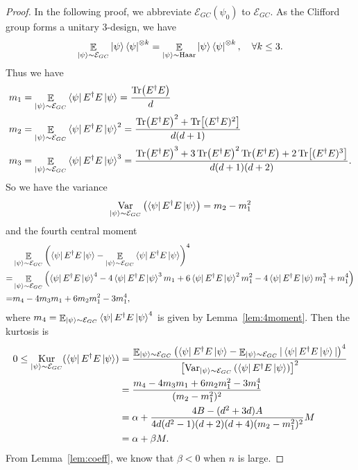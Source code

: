 \documentclass[showpacs,amsmath,amssymb,twocolumn,aps,pra,superscriptaddress,notitlepage,10pt]{revtex4-2}
\newcommand{\bE}{\mathbb E}
\newcommand{\cM}{\mathcal E_{GC}}
\begin{document}
\begin{proof}
    In the following proof, we abbreviate $\cM(\psi_0)$ to $\cM$. As the Clifford group forms a unitary 3-design, we have
    \begin{equation}
        \mathop{\bE}_{\ket{\psi}\sim\cM}\ket{\psi}\bra{\psi}^{\otimes k}=\mathop{\bE}_{\ket{\psi}\sim\mathrm{Haar}}\ket{\psi}\bra{\psi}^{\otimes k},\quad\forall k\le3.
    \end{equation}
    Thus we have
    \begin{align}
        m_1&=\mathop{\bE}_{\ket{\psi}\sim\cM}\bra{\psi}E^\dagger E\ket{\psi}=\frac{\Tr(E^\dagger E)}{d}\\
        m_2&=\mathop{\bE}_{\ket{\psi}\sim\cM}\bra{\psi}E^\dagger E\ket{\psi}^2=\frac{\Tr(E^\dagger E)^2+\Tr[(E^\dagger E)^2]}{d(d+1)}\\
        m_3&=\mathop{\bE}_{\ket{\psi}\sim\cM}\bra{\psi}E^\dagger E\ket{\psi}^3=\frac{\Tr(E^\dagger E)^3+3\Tr(E^\dagger E)^2\Tr(E^\dagger E)+2\Tr[(E^\dagger E)^3]}{d(d+1)(d+2)}.
    \end{align}
    So we have the variance
    \begin{equation}
            \mathop{\mathrm{Var}}_{\ket{\psi}\sim\cM}\left(\bra{\psi}E^\dagger E\ket{\psi}\right)=m_2-m_1^2
    \end{equation}
    and the fourth central moment
    \begin{equation}
        \begin{aligned}
            &\mathop{\bE}_{\ket{\psi}\sim\cM}\left(\bra{\psi}E^\dagger E\ket{\psi}-\mathop{\bE}_{\ket{\psi}\sim\cM}\bra{\psi}E^\dagger E\ket{\psi}\right)^4\\
            =&\mathop{\bE}_{\ket{\psi}\sim\cM}\left(\bra{\psi}E^\dagger E\ket{\psi}^4-4\bra{\psi}E^\dagger E\ket{\psi}^3m_1+6\bra{\psi}E^\dagger E\ket{\psi}^2m_1^2-4\bra{\psi}E^\dagger E\ket{\psi}m_1^3+m_1^4\right)\\
            =&m_4-4m_3m_1+6m_2m_1^2-3m_1^4,
        \end{aligned}
    \end{equation}
    where $m_4=\mathop{\bE}_{\ket{\psi}\sim\cM}\bra{\psi}E^\dagger E\ket{\psi}^4$ is given by Lemma~\ref{lem:4moment}. Then the kurtosis is
    \begin{equation}
        \begin{aligned}
            0\le\mathop{\mathrm{Kur}}_{\ket{\psi}\sim\cM}(\bra{\psi}E^\dagger E\ket{\psi})&=\frac{\mathop{\bE}_{\ket{\psi}\sim\cM}\left(\bra{\psi}E^\dagger E\ket{\psi}-\mathop{\bE}_{\ket{\psi}\sim\cM}|\bra{\psi}E^\dagger E\ket{\psi}|\right)^4}{\left[\mathop{\mathrm{Var}}_{\ket{\psi}\sim\cM}\left(\bra{\psi}E^\dagger E\ket{\psi}\right)\right]^2}\\
            &=\frac{m_4-4m_3m_1+6m_2m_1^2-3m_1^4}{(m_2-m_1^2)^2}\\
            &=\alpha+\frac{4B-(d^2+3d)A}{4d(d^2-1)(d+2)(d+4)(m_2-m_1^2)^2}M\\
            &=\alpha+\beta M.
        \end{aligned}
    \end{equation}
    From Lemma~\ref{lem:coeff}, we know that $\beta<0$ when $n$ is large.
\end{proof}
\end{document}
